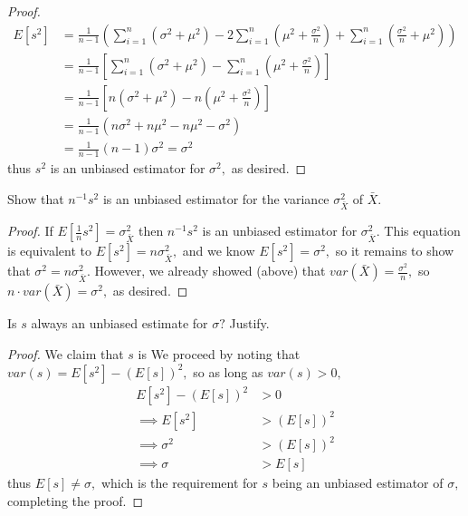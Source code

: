 \documentclass{article}
\begin{document}
\begin{enumerate}
\begin{enumerate}
\begin{proof}
\begin{align*}
				E[s^2] &= \frac{1}{n-1}\left( \sum_{i=1}^n (\sigma^2+\mu^2) - 2\sum_{i=1}^n\left( \mu^2+\frac{\sigma^2}{n} \right) + \sum_{i=1}^n\left( \frac{\sigma^2}{n}+\mu^2 \right) \right) \\
				&= \frac{1}{n-1}\left[\sum_{i=1}^n (\sigma^2+\mu^2)-\sum_{i=1}^n\left( \mu^2+\frac{\sigma^2}{n} \right)\right] \\
				&= \frac{1}{n-1}\left[ n(\sigma^2+\mu^2) - n\left( \mu^2+\frac{\sigma^2}{n} \right) \right] \\
				&= \frac{1}{n-1}(n\sigma^2+n\mu^2-n\mu^2-\sigma^2) \\
				&= \frac{1}{n-1}(n-1)\sigma^2 = \sigma^2
			\end{align*} thus $s^2$ is an unbiased estimator for $\sigma^2,$ as desired.
			\end{proof}

		\ii Show that $n^{-1}s^2$ is an unbiased estimator for the variance $\sigma_{\bar{X}}^2$ of $\bar{X}.$
			\begin{proof}
				If $E\left[\frac{1}{n}s^2\right]=\sigma_{\bar{X}}^2$ then $n^{-1}s^2$ is an unbiased estimator for $\sigma_{\bar{X}}^2.$ This equation is equivalent to $E[s^2]=n\sigma_{\bar{X}}^2,$ and we know $E[s^2]=\sigma^2,$ so it remains to show that $\sigma^2=n\sigma_{\bar{X}}^2.$ However, we already showed (above) that $var(\bar{X})=\frac{\sigma^2}{n},$ so $n\cdot var(\bar{X})=\sigma^2,$ as desired.
			\end{proof}

		\ii Is $s$ always an unbiased estimate for $\sigma?$ Justify.
			\begin{proof}
				We claim that $s$ is  We proceed by noting that $var(s)=E[s^2]-(E[s])^2,$ so as long as $var(s)>0,$
				\begin{align*}
					E[s^2]-(E[s])^2 &> 0 \\
					\implies E[s^2] &> (E[s])^2 \\
					\implies \sigma^2 &> (E[s])^2 \\
					\implies \sigma &> E[s]
				\end{align*} thus $E[s]\neq\sigma,$ which is the requirement for $s$ being an unbiased estimator of $\sigma,$ completing the proof.		
			\end{proof}
	\end{enumerate}

	\newpage


\end{enumerate}
\end{document}
